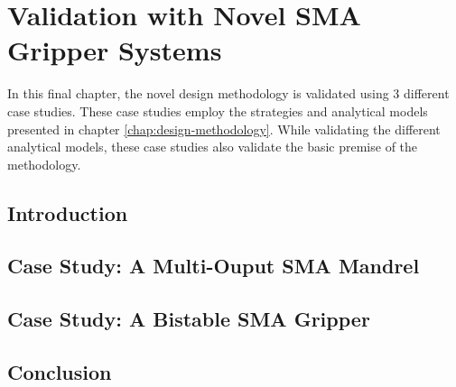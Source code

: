 
\chapter{Validation with Novel SMA Gripper Systems}\label{chap:case-study}
In this final chapter, the novel design methodology is validated using 3 different case studies. These case studies employ the strategies and analytical models presented in chapter \ref{chap:design-methodology}. While validating the different analytical models, these case studies also validate the basic premise of the methodology.
\section{Introduction}
\section{Case Study: A Multi-Ouput SMA Mandrel}\label{sec:smacm-mandrel}
\section{Case Study: A Bistable SMA Gripper}\label{sec:smabb-gripper}
\section{Conclusion}
